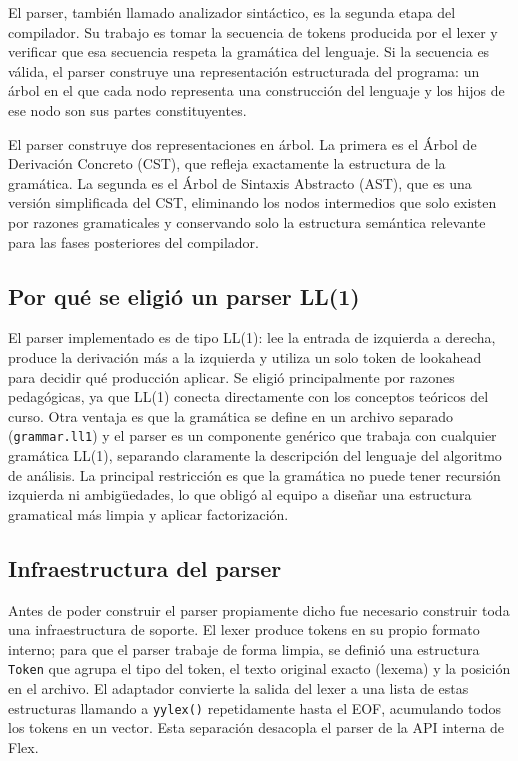 \documentclass[11pt,a4paper]{article}
\begin{document}
El parser, también llamado analizador sintáctico, es la segunda etapa del compilador. Su trabajo es tomar la secuencia de tokens producida por el lexer y verificar que esa secuencia respeta la gramática del lenguaje. Si la secuencia es válida, el parser construye una representación estructurada del programa: un árbol en el que cada nodo representa una construcción del lenguaje y los hijos de ese nodo son sus partes constituyentes.

El parser construye dos representaciones en árbol. La primera es el Árbol de Derivación Concreto (CST), que refleja exactamente la estructura de la gramática. La segunda es el Árbol de Sintaxis Abstracto (AST), que es una versión simplificada del CST, eliminando los nodos intermedios que solo existen por razones gramaticales y conservando solo la estructura semántica relevante para las fases posteriores del compilador.

\subsection{Por qué se eligió un parser LL(1)}

El parser implementado es de tipo LL(1): lee la entrada de izquierda a derecha, produce la derivación más a la izquierda y utiliza un solo token de lookahead para decidir qué producción aplicar. Se eligió principalmente por razones pedagógicas, ya que LL(1) conecta directamente con los conceptos teóricos del curso. Otra ventaja es que la gramática se define en un archivo separado (\texttt{grammar.ll1}) y el parser es un componente genérico que trabaja con cualquier gramática LL(1), separando claramente la descripción del lenguaje del algoritmo de análisis. La principal restricción es que la gramática no puede tener recursión izquierda ni ambigüedades, lo que obligó al equipo a diseñar una estructura gramatical más limpia y aplicar factorización.

\subsection{Infraestructura del parser}

Antes de poder construir el parser propiamente dicho fue necesario construir toda una infraestructura de soporte. El lexer produce tokens en su propio formato interno; para que el parser trabaje de forma limpia, se definió una estructura \texttt{Token} que agrupa el tipo del token, el texto original exacto (lexema) y la posición en el archivo. El adaptador convierte la salida del lexer a una lista de estas estructuras llamando a \texttt{yylex()} repetidamente hasta el EOF, acumulando todos los tokens en un vector. Esta separación desacopla el parser de la API interna de Flex.
\end{document}
